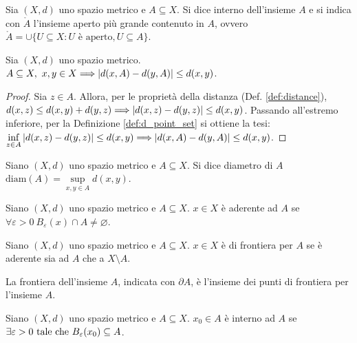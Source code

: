 \begin{definition}
    Sia $(X, d)$ uno spazio metrico e $A \subseteq X$. Si dice interno dell'insieme $A$ e si indica con $\mathring{A}$ l'insieme aperto più grande contenuto in $A$, ovvero $\mathring{A} = \cup\{U\subseteq X: U \text{ è aperto}, U \subseteq A\}$.
\end{definition}

\begin{prop}
    Sia $(X, d)$ uno spazio metrico. $A \subseteq X, \ x,y \in X \Longrightarrow \abs{d(x,A)-d(y,A)}\leq d(x,y)$.
\end{prop}

\begin{proof}
    Sia $z \in A$. Allora, per le proprietà della distanza (Def. \ref{def:distance}), $d(x,z)\leq d(x,y)+d(y,z)\Longrightarrow \abs{d(x,z)-d(y,z)}\leq d(x,y)$. Passando all'estremo inferiore, per la Definizione \ref{def:d_point_set} si ottiene la tesi: $\inf\limits_{z\in A}\abs{d(x,z)-d(y,z)}\leq d(x,y)\Longrightarrow \abs{d(x,A)-d(y,A)}\leq d(x,y)$.
\end{proof}

\begin{definition}
    [Diametro]
    Siano $(X,d)$ uno spazio metrico e $A \subseteq X$. Si dice diametro di $A$ $\text{diam}(A)=\sup\limits_{x,y \in A}d(x,y)$.
\end{definition}

\begin{definition}
    Siano $(X,d)$ uno spazio metrico e $A \subseteq X$. $x \in X$ è aderente ad $A$ se $\forall \varepsilon > 0 \ B_\varepsilon(x)\cap A \neq \varnothing$.
\end{definition}

\begin{definition}
    Siano $(X,d)$ uno spazio metrico e $A \subseteq X$. $x \in X$ è di frontiera per $A$ se è aderente sia ad $A$ che a $X \setminus A$.
\end{definition}

\begin{definition}
    [Frontiera]
    La frontiera dell'insieme $A$, indicata con $\partial A$, è l'insieme dei punti di frontiera per l'insieme $A$.
\end{definition}

\begin{definition}
    Siano $(X,d)$ uno spazio metrico e $A \subseteq X$. $x_0 \in A$ è interno ad $A$ se $\exists \varepsilon > 0 \text{ tale che } B_\varepsilon(x_0)\subseteq A$.
\end{definition}

